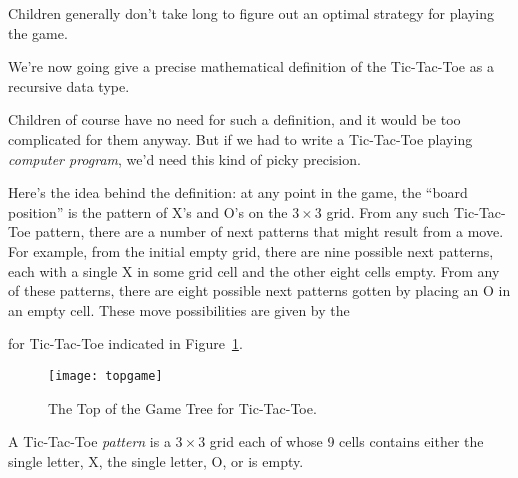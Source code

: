 \begin{definition}
\begin{staffnotes}
Children generally don't take long to figure out an optimal strategy
for playing the game.
\end{staffnotes}

We're now going give a precise mathematical definition of the Tic-Tac-Toe
 as a recursive data type.  \iffalse and carefully defining
the allowed moves\fi
\begin{staffnotes}
Children of course have no need for such a definition, and it would be
too complicated for them anyway.  But if we had to write a Tic-Tac-Toe
playing \emph{computer program}, we'd need this kind of picky
precision.
\end{staffnotes}

Here's the idea behind the definition: at any point in the game, the
``board position'' is the pattern of X's and O's on the $3 \times 3$
grid.  From any such Tic-Tac-Toe pattern, there are a number of next
patterns that might result from a move.  For example, from the initial
empty grid, there are nine possible next patterns, each with a single
X in some grid cell and the other eight cells empty.  From any of
these patterns, there are eight possible next patterns gotten by
placing an O in an empty cell.  These move possibilities are given by
the
 for Tic-Tac-Toe indicated in
Figure~\ref{fig:Tic-Tac-Toe}.

\begin{figure}
\texttt{[image: topgame]}
\caption{The Top of the Game Tree for Tic-Tac-Toe.}
\label{fig:Tic-Tac-Toe}
\end{figure}


\iffalse
\[\begin{array}{c|c|c}
\hspace{.1in} & \hspace{.1in} & \hspace{.1in}\\
\hline  & &\\
\hline  & &
\end{array}\]

\textbf{FIGURE NEEDED}
\fi

\begin{definition}

A Tic-Tac-Toe \emph{pattern} is a $3 \times 3$ grid each of whose 9 cells
contains either the single letter, X, the single letter, O, or is
empty.
\begin{staffnotes}


\end{staffnotes}
\end{definition}
\end{definition}
